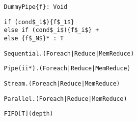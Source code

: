 \begin{table*}
\newsavebox{\pipeSignature}
\begin{lrbox}{\pipeSignature}
\begin{lstlisting}[language=SpatialTable]
DummyPipe{f}: Void
\end{lstlisting}
\end{lrbox}

\newsavebox{\ifSignature}
\begin{lrbox}{\ifSignature}
\begin{lstlisting}[language=SpatialTable]
if (cond$_1$){f$_1$}
else if (cond$_i$){f$_i$} +
else {f$_N$}* : T
\end{lstlisting}
\end{lrbox}

\newsavebox{\sequentialTag}
\begin{lrbox}{\sequentialTag}
\begin{lstlisting}[language=SpatialTable]
Sequential.(Foreach|Reduce|MemReduce)
\end{lstlisting}
\end{lrbox}

\newsavebox{\pipeTag}
\begin{lrbox}{\pipeTag}
\begin{lstlisting}[language=SpatialTable]
Pipe(ii*).(Foreach|Reduce|MemReduce)
\end{lstlisting}
\end{lrbox}

\newsavebox{\streamTag}
\begin{lrbox}{\streamTag}
\begin{lstlisting}[language=SpatialTable]
Stream.(Foreach|Reduce|MemReduce)
\end{lstlisting}
\end{lrbox}

\newsavebox{\parallelTag}
\begin{lrbox}{\parallelTag}
\begin{lstlisting}[language=SpatialTable]
Parallel.(Foreach|Reduce|MemReduce)
\end{lstlisting}
\end{lrbox}

\newsavebox{\fifoSyntax}
\begin{lrbox}{\fifoSyntax}
\begin{lstlisting}[language=SpatialTable]
FIFO[T](depth)
\end{lstlisting}
\end{lrbox}


\end{table*}
